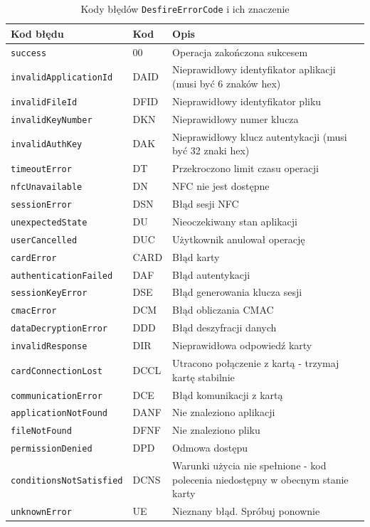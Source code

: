 \documentclass[a4paper,12pt]{article}
\begin{document}
\begin{table}[h!]
\centering
\begin{tabular}{|l|l|p{6cm}|}
\hline
\textbf{Kod błędu} & \textbf{Kod} & \textbf{Opis} \\
\hline
\texttt{success} & 00 & Operacja zakończona sukcesem \\
\hline
\texttt{invalidApplicationId} & DAID & Nieprawidłowy identyfikator aplikacji (musi być 6 znaków hex) \\
\hline
\texttt{invalidFileId} & DFID & Nieprawidłowy identyfikator pliku \\
\hline
\texttt{invalidKeyNumber} & DKN & Nieprawidłowy numer klucza \\
\hline
\texttt{invalidAuthKey} & DAK & Nieprawidłowy klucz autentykacji (musi być 32 znaki hex) \\
\hline
\texttt{timeoutError} & DT & Przekroczono limit czasu operacji \\
\hline
\texttt{nfcUnavailable} & DN & NFC nie jest dostępne \\
\hline
\texttt{sessionError} & DSN & Błąd sesji NFC \\
\hline
\texttt{unexpectedState} & DU & Nieoczekiwany stan aplikacji \\
\hline
\texttt{userCancelled} & DUC & Użytkownik anulował operację \\
\hline
\texttt{cardError} & CARD & Błąd karty \\
\hline
\texttt{authenticationFailed} & DAF & Błąd autentykacji \\
\hline
\texttt{sessionKeyError} & DSE & Błąd generowania klucza sesji \\
\hline
\texttt{cmacError} & DCM & Błąd obliczania CMAC \\
\hline
\texttt{dataDecryptionError} & DDD & Błąd deszyfracji danych \\
\hline
\texttt{invalidResponse} & DIR & Nieprawidłowa odpowiedź karty \\
\hline
\texttt{cardConnectionLost} & DCCL & Utracono połączenie z kartą - trzymaj kartę stabilnie \\
\hline
\texttt{communicationError} & DCE & Błąd komunikacji z kartą \\
\hline
\texttt{applicationNotFound} & DANF & Nie znaleziono aplikacji \\
\hline
\texttt{fileNotFound} & DFNF & Nie znaleziono pliku \\
\hline
\texttt{permissionDenied} & DPD & Odmowa dostępu \\
\hline
\texttt{conditionsNotSatisfied} & DCNS & Warunki użycia nie spełnione - kod polecenia niedostępny w obecnym stanie karty \\
\hline
\texttt{unknownError} & UE & Nieznany błąd. Spróbuj ponownie \\
\hline
\end{tabular}
\caption{Kody błędów \texttt{DesfireErrorCode} i ich znaczenie}
\end{table}
\end{document}
